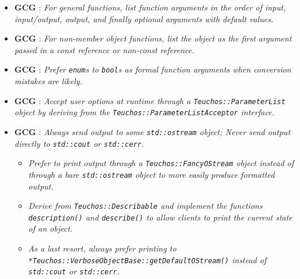 \begin{itemize}
\begin{itemize}
  {}\item{}\textbf{GCG
  {}}: {}\textit{For general functions, list function
  arguments in the order of input, input/output, output, and finally optional
  arguments with default values.}

  {}\item{}\textbf{GCG
  {}}: {}\textit{For non-member object functions, list
  the object as the first argument passed in a const reference or non-const
  reference.}

  {}\item{}\textbf{GCG
  {}}: {}\textit{Prefer {}\texttt{enum}s to
  {}\texttt{bool}s as formal function arguments when conversion mistakes are
  likely.}

  {}\item{}\textbf{GCG
  {}}: {}\textit{Accept user options at runtime
  through a {}\texttt{Teuchos\-::Parameter\-List} object by deriving from the
  {}\texttt{Teuchos\-::Parameter\-List\-Acceptor} interface.}

  {}\item{}\textbf{GCG
  {}}: {}\textit{Always send output to some
  {}\texttt{std\-::ostream} object; Never send output directly to
  {}\texttt{std\-::cout} or {}\texttt{std\-::cerr}.}

    \begin{itemize}

    {}\item\textit{Prefer to print output through a
    {}\texttt{Teuchos\-::Fancy\-OStream} object instead of through a bare
    {}\texttt{std\-::ostream} object to more easily produce formatted output.}
  
    {}\item\textit{Derive from {}\texttt{Teuchos\-::Describable} and implement
    the functions {}\texttt{description()} and {}\texttt{describe()} to allow
    clients to print the current state of an object.}
  
    {}\item\textit{As a last resort, always prefer printing to
    {}\texttt{*Teuchos\-::Verbose\-Object\-Base\-::get\-Default\-OStream()}
    instead of {}\texttt{std\-::cout} or {}\texttt{std\-::cerr}.}

    \end{itemize}
  

\end{itemize}
\end{itemize}
